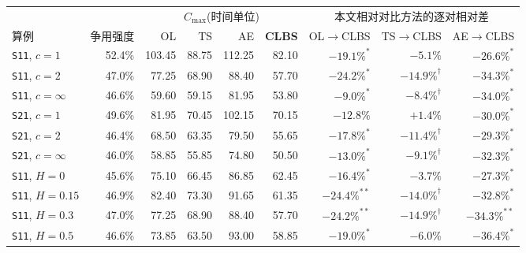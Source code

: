 \begin{tabular}{@{}lrrrrrrrr@{}}
\toprule
& & \multicolumn{4}{c}{$C_{\max}$(时间单位)} & \multicolumn{3}{c}{本文相对对比方法的逐对相对差} \\
\cmidrule(lr){3-6}\cmidrule(lr){7-9}
算例 & 争用强度 & OL & TS & AE & \textbf{CLBS} & OL$\rightarrow$CLBS & TS$\rightarrow$CLBS & AE$\rightarrow$CLBS \\
\midrule
\texttt{S11}, $c=1$ & 52.4\% & 103.45 & 88.75 & 112.25 & 82.10 & $-19.1\%^{*}$ & $-5.1\%$ & $-26.6\%^{*}$ \\
\texttt{S11}, $c=2$ & 47.0\% & 77.25 & 68.90 & 88.40 & 57.70 & $-24.2\%^{*}$ & $-14.9\%^{\dagger}$ & $-34.3\%^{*}$ \\
\texttt{S11}, $c=\infty$ & 46.6\% & 59.60 & 59.15 & 81.95 & 53.80 & $-9.0\%^{*}$ & $-8.4\%^{\dagger}$ & $-34.0\%^{*}$ \\
\texttt{S21}, $c=1$ & 49.6\% & 81.95 & 70.45 & 102.15 & 70.15 & $-12.8\%$ & $+1.4\%$ & $-30.0\%^{*}$ \\
\texttt{S21}, $c=2$ & 46.4\% & 68.50 & 63.35 & 79.50 & 55.65 & $-17.8\%^{*}$ & $-11.4\%^{\dagger}$ & $-29.3\%^{*}$ \\
\texttt{S21}, $c=\infty$ & 46.0\% & 58.85 & 55.85 & 74.80 & 50.50 & $-13.0\%^{*}$ & $-9.1\%^{\dagger}$ & $-32.3\%^{*}$ \\
\midrule
\texttt{S11}, $H=0$ & 45.6\% & 75.10 & 66.45 & 86.85 & 62.45 & $-16.4\%^{*}$ & $-3.7\%$ & $-27.3\%^{*}$ \\
\texttt{S11}, $H=0.15$ & 46.9\% & 82.40 & 73.30 & 91.65 & 61.35 & $-24.4\%^{**}$ & $-14.0\%^{\dagger}$ & $-32.8\%^{*}$ \\
\texttt{S11}, $H=0.3$ & 47.0\% & 77.25 & 68.90 & 88.40 & 57.70 & $-24.2\%^{**}$ & $-14.9\%^{\dagger}$ & $-34.3\%^{**}$ \\
\texttt{S11}, $H=0.5$ & 46.6\% & 73.85 & 63.50 & 93.00 & 58.85 & $-19.0\%^{*}$ & $-6.0\%$ & $-36.4\%^{*}$ \\
\bottomrule
\end{tabular}
